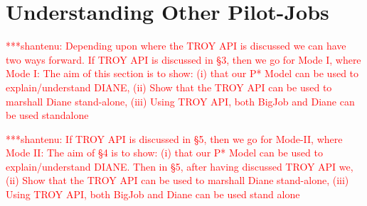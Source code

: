 \documentclass[conference,final]{IEEEtran}
\newcommand{\jhanote}[1]{ {\textcolor{red} { ***shantenu: #1 }}}
\newcommand{\jhanote}[1]{}
\newcommand{\upp}{\vspace*{-0.5em}}
\begin{document}
% 
% 


\section{Understanding Other Pilot-Jobs\upp\upp}


\jhanote{Depending upon where the TROY API is discussed we can have
  two ways forward. If TROY API is discussed in \S 3, then we go for
  Mode I, where Mode I: The aim of this section is to show: (i) that
  our P* Model can be used to explain/understand DIANE, (ii) Show that
  the TROY API can be used to marshall Diane stand-alone, (iii) Using
  TROY API, both BigJob and Diane can be used standalone}

\jhanote{If TROY API is discussed in \S 5, then we go for Mode-II,
  where Mode II: The aim of \S 4 is to show: (i) that our P* Model can
  be used to explain/understand DIANE.  Then in \S 5, after having
  discussed TROY API we, (ii) Show that the TROY API can be used to
  marshall Diane stand-alone, (iii) Using TROY API, both BigJob and
  Diane can be used stand alone}
\end{document}

